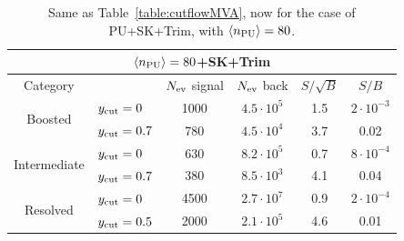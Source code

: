 \begin{table}[t]
  \centering
  \begin{tabular}{|c|l|c|c|c|c|}
        \hline
     \multicolumn{6}{|c|}{$\left\langle n_{\rm PU}\right\rangle=80$+SK+Trim} \\
     \hline
         \hline
    Category  &   &  $N_{\rm ev}$ signal &  $N_{\rm ev}$ back  &  $S/\sqrt{B}$ & $S/B$ \\ 
    \hline
    \hline
    \multirow{2}{*}{Boosted} &  $y_{\rm cut}=0$  & 1000   &  $4.5\cdot 10^5$ & 1.5   & $2\cdot 10^{-3}$  \\
    &  $y_{\rm cut}=0.7$ &  780  & $4.5\cdot 10^4$  & 3.7    & 0.02  \\
    \hline
    \hline
    \multirow{2}{*}{Intermediate} &  $y_{\rm cut}=0$  &  630  & $8.2\cdot 10^5$    & 0.7    &
     $8\cdot 10^{-4}$ \\
    &  $y_{\rm cut}=0.7$ & 380 & $8.5\cdot 10^3$  &  4.1   & 0.04 \\
    \hline
    \hline
    \multirow{2}{*}{Resolved} &  $y_{\rm cut}=0$  &  4500  & $2.7\cdot 10^7$
    & 0.9    &  $2\cdot 10^{-4}$  \\
    &  $y_{\rm cut}=0.5$ & 2000  & $2.1\cdot 10^5$  &  4.6   & 0.01  \\
    \hline
      \end{tabular}
  \caption{\small Same as Table~\ref{table:cutflowMVA}, now for the case
    of PU+SK+Trim, with $\left\langle n_{\rm PU}\right\rangle=80$.
        \label{table:cutflowMVA_PU}
  }
\end{table}





